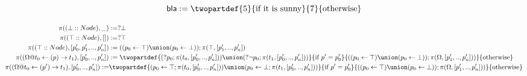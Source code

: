 \[
  \mathsf{bla} := \twopartdef{5}{\text{if it is sunny}}{7}{\text{otherwise}}
\]






\begin{align*}
    \pi((\bot :: Node), \_)  &:= ? \bot\\
    \pi((\top :: Node), [])  &:= ? \top\\
    \pi((\top :: Node), [p_0',p_1',..,p_n'])  &:= ((p_0 \leftarrow \top) \union (p_0 \leftarrow \bot)) ; \pi(\top,[p_1',..,p_n'])\\
    \pi((\Omega@t_0 \leftarrow (p) \rightarrow t_1),[p_0',..,p_n']) &:=
      \twopartdef
      {(?p_0;\pi(t_0,[p_0',..,p_n'])) \union (?\neg p_0;\pi(t_1,[p_0',..,p_n']))}{\text{if } p'= p_0'}
      {((p_0 \leftarrow \top) \union (p_0 \leftarrow \bot)) ; \pi(\Omega,[p_1',..,p_n']))}{\text{otherwise}}
    \\
    \pi((\Omega@t_0 \leftarrow (p') \rightarrow t_1),[p_0',..,p_n']) :=& \twopartdef
       {(p_0 \leftarrow \top;\pi(t_0,[p_0',..,p_n'])) \union (p_0 \leftarrow \bot;\pi(t_1,[p_0',..,p_n']))}{\text{if } p' = p_0'}
       {((p_0 \leftarrow \top) \union (p_0 \leftarrow \bot)) ; \pi(\Omega,[p_1',..,p_n']))}{\text{otherwise}}
\end{align*}